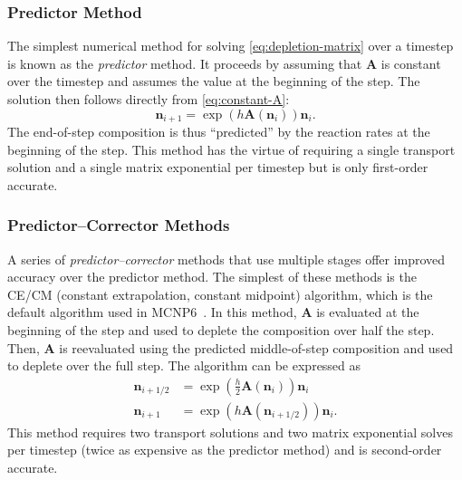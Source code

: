 \documentclass[3p,authoryear]{elsarticle}
\newcommand{\vect}[1]{\mathbf{#1}} %
\begin{document}
\subsubsection{Predictor Method}

The simplest numerical method for solving \cref{eq:depletion-matrix} over a
timestep is known as the \emph{predictor} method. It proceeds by assuming that
$\vect{A}$ is constant over the timestep and assumes the value at the
beginning of the step. The solution then follows directly from
\cref{eq:constant-A}:
\begin{equation}
  \label{eq:predictor}
  \vect{n}_{i+1} = \exp\left(h\vect{A}(\vect{n}_i) \right) \vect{n}_i.
\end{equation}
The end-of-step composition is thus ``predicted'' by the reaction rates at the
beginning of the step. This method has the virtue of requiring a single
transport solution and a single matrix exponential per timestep but is only
first-order accurate.

\subsubsection{Predictor--Corrector Methods}

A series of \emph{predictor--corrector} methods that use multiple stages offer
improved accuracy over the predictor method. The simplest of these methods is
the CE/CM (constant extrapolation, constant midpoint) algorithm, which is the
default algorithm used in MCNP6~\citep{fensin2006tans}. In this method,
$\vect{A}$ is evaluated at the beginning of the step and used to deplete the
composition over half the step. Then, $\vect{A}$ is reevaluated using the
predicted middle-of-step composition and used to deplete over the full step. The
algorithm can be expressed as
\begin{equation}
  \begin{split}
    \vect{n}_{i+1/2} &= \exp \left (\frac{h}{2}\vect{A}(\vect{n}_i) \right) \vect{n}_i \\
    \vect{n}_{i+1} &= \exp \left(h \vect{A}(\vect{n}_{i+1/2}) \right) \vect{n}_i.
  \end{split}
\end{equation}
This method requires two transport solutions and two matrix exponential solves
per timestep (twice as expensive as the predictor method) and is second-order
accurate.
\end{document}
